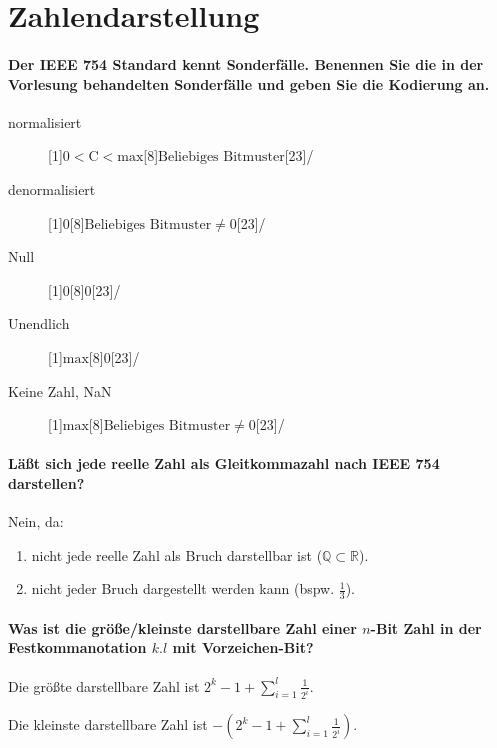 \section{Zahlendarstellung}
\paragraph{Der IEEE 754 Standard kennt Sonderfälle. Benennen Sie die in der Vorlesung behandelten Sonderfälle und geben Sie die Kodierung an.}
\begin{description}
	\item[normalisiert]    \bitpattern[startBit = 31, noBitNumbers]{$ \pm $}[1]{$ 0 < \text{C} < \text{max} $}[8]{$ \text{Beliebiges Bitmuster} $}[23]/
	\item[denormalisiert]  \bitpattern[startBit = 31, noBitNumbers]{$ \pm $}[1]{$ 0 $}[8]{$ \text{Beliebiges Bitmuster} \neq 0 $}[23]/
	\item[Null]            \bitpattern[startBit = 31, noBitNumbers]{$ \pm $}[1]{$ 0 $}[8]{$ 0 $}[23]/
	\item[Unendlich]       \bitpattern[startBit = 31, noBitNumbers]{$ \pm $}[1]{$ \text{max} $}[8]{$ 0 $}[23]/
	\item[Keine Zahl, NaN] \bitpattern[startBit = 31, noBitNumbers]{$ \pm $}[1]{$ \text{max} $}[8]{$ \text{Beliebiges Bitmuster} \neq 0 $}[23]/
\end{description}

\paragraph{Läßt sich jede reelle Zahl als Gleitkommazahl nach IEEE 754 darstellen?}
Nein, da:
\begin{enumerate}
	\item nicht jede reelle Zahl als Bruch darstellbar ist ($ \mathbb{Q} \subset \mathbb{R} $).
	\item nicht jeder Bruch dargestellt werden kann (bspw. $ \frac{1}{3} $).
\end{enumerate}

\paragraph{Was ist die größe/kleinste darstellbare Zahl einer $ n $-Bit Zahl in der Festkommanotation $ k.l $ mit Vorzeichen-Bit?}
Die größte darstellbare Zahl ist $ 2 ^ k - 1 + \sum _ { i = 1 } ^ { l } \frac{1}{2 ^ i} $.

Die kleinste darstellbare Zahl ist $ -(2 ^ k - 1 + \sum _ { i = 1 } ^ { l } \frac{1}{2 ^ i}) $.

